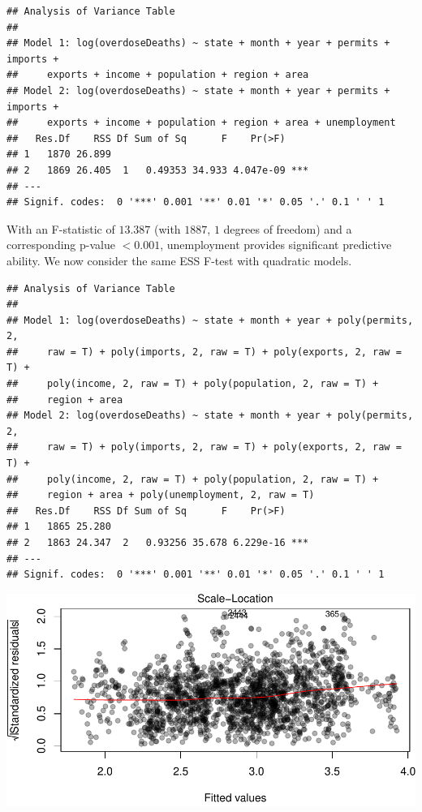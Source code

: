 \documentclass[]{article}
\begin{document}
\begin{verbatim}
## Analysis of Variance Table
## 
## Model 1: log(overdoseDeaths) ~ state + month + year + permits + imports + 
##     exports + income + population + region + area
## Model 2: log(overdoseDeaths) ~ state + month + year + permits + imports + 
##     exports + income + population + region + area + unemployment
##   Res.Df    RSS Df Sum of Sq      F    Pr(>F)    
## 1   1870 26.899                                  
## 2   1869 26.405  1   0.49353 34.933 4.047e-09 ***
## ---
## Signif. codes:  0 '***' 0.001 '**' 0.01 '*' 0.05 '.' 0.1 ' ' 1
\end{verbatim}

With an F-statistic of \(13.387\) (with \(1887\), \(1\) degrees of
freedom) and a corresponding p-value \(<0.001\), unemployment provides
significant predictive ability. We now consider the same ESS F-test with
quadratic models.

\begin{verbatim}
## Analysis of Variance Table
## 
## Model 1: log(overdoseDeaths) ~ state + month + year + poly(permits, 2, 
##     raw = T) + poly(imports, 2, raw = T) + poly(exports, 2, raw = T) + 
##     poly(income, 2, raw = T) + poly(population, 2, raw = T) + 
##     region + area
## Model 2: log(overdoseDeaths) ~ state + month + year + poly(permits, 2, 
##     raw = T) + poly(imports, 2, raw = T) + poly(exports, 2, raw = T) + 
##     poly(income, 2, raw = T) + poly(population, 2, raw = T) + 
##     region + area + poly(unemployment, 2, raw = T)
##   Res.Df    RSS Df Sum of Sq      F    Pr(>F)    
## 1   1865 25.280                                  
## 2   1863 24.347  2   0.93256 35.678 6.229e-16 ***
## ---
## Signif. codes:  0 '***' 0.001 '**' 0.01 '*' 0.05 '.' 0.1 ' ' 1
\end{verbatim}

\begin{center}\includegraphics{stat139_project_final_files/figure-latex/polynomial-1} \end{center}
\end{document}
